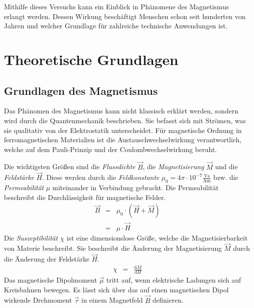 \documentclass[12pt,a4paper]{scrartcl}
\numberwithin{equation}{section} %
\newcommand{\pu}[1]{\ensuremath{\mathrm{#1}}}
\renewcommand{\[}{} %
\renewcommand{\]}{\noindent} %
\begin{document}
Mithilfe dieses Versuchs kann ein Einblick in Phänomene des Magnetismus erlangt werden. Dessen Wirkung beschäftigt Menschen schon seit hunderten von Jahren und welcher Grundlage für zahlreiche technische Anwendungen ist.

\clearpage
\hypertarget{theoretische-grundlagen}{%
\section{Theoretische Grundlagen}\label{theoretische-grundlagen}}

\hypertarget{grundlagen-des-magnetismus}{%
\subsection{Grundlagen des Magnetismus}\label{grundlagen-des-magnetismus}}

Das Phänomen des Magnetismus kann nicht klassisch erklärt werden, sondern wird durch die Quantenmechanik beschrieben. Sie befasst sich mit Strömen, was sie qualitativ von der Elektrostatik unterscheidet. Für magnetische Ordnung in ferromagnetischen Materialien ist die
Austauschwechselwirkung verantwortlich, welche auf dem Pauli-Prinzip und der Coulombwechselwirkung beruht.

Die wichtigsten Größen sind die \emph{Flussdichte} \(\vec B\), die \emph{Magnetisierung} \(\vec M\) und die \emph{Feldstärke} \(\vec H\). Diese werden durch die \emph{Feldkonstante}
\(\mu_0=4\pi\cdot\pu{10^{-7}\frac{Vs}{Am}}\) bzw. die \emph{Permeabilität} \(\mu\) miteinander in Verbindung gebracht. Die Permeabilität beschreibt die Durchlässigkeit für magnetische Felder. \cite{Jackson}
\begin{eqnarray}
    \vec B
        &=& \mu_0 \cdot \left(\vec H + \vec M\right) \label{M1} \\
        &=& \mu \cdot \vec H
\end{eqnarray}
Die \emph{Suszeptibilität} \(\chi\) ist eine dimensionslose Größe, welche die Magnetisierbarkeit von Materie beschreibt. Sie beschreibt die Änderung der Magnetisierung \(\vec M\) durch die Änderung der Feldstärke \(\vec H\).
\begin{eqnarray}
    \chi &=& \frac{\mathrm dM}{\mathrm dH} \label{Chi}
\end{eqnarray}
Das magnetische Dipolmoment \(\vec \mu\) tritt auf, wenn elektrische Ladungen sich auf Kreisbahnen bewegen. Es lässt sich über das auf einen magnetischen Dipol wirkende Drehmoment \(\vec \tau\) in einem Magnetfeld \(\vec B\) definieren.
\end{document}
